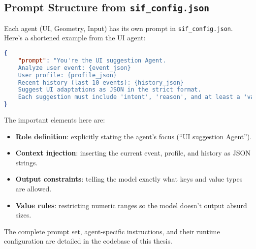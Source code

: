 \subsection{Prompt Structure from \texttt{sif\_config.json}}
Each agent (UI, Geometry, Input) has its own prompt in \texttt{sif\_config.json}.\\
Here’s a shortened example from the UI agent:
\begin{lstlisting}[caption=Example UI Agent Prompt, language=json]
{
    "prompt": "You're the UI suggestion Agent.  
    Analyze user event: {event_json}  
    User profile: {profile_json}  
    Recent history (last 10 events): {history_json}  
    Suggest UI adaptations as JSON in the strict format.  
    Each suggestion must include 'intent', 'reason', and at least a 'value' and 'mode' field. Value must be a reasonable number (e.g., 1.2) with at most one decimal place, and represents a scaling value unless stated otherwise in the metadata (e.g. font size). Target can be 'all' or specific elements."
}
\end{lstlisting}
The important elements here are:
\begin{itemize}
    \item \textbf{Role definition}: explicitly stating the agent’s focus (“UI suggestion Agent”).
    \item \textbf{Context injection}: inserting the current event, profile, and history as JSON strings.
    \item \textbf{Output constraints}: telling the model exactly what keys and value types are allowed.
    \item \textbf{Value rules}: restricting numeric ranges so the model doesn’t output absurd sizes.
\end{itemize}
The complete prompt set, agent-specific instructions, and their runtime configuration are detailed in the codebase of this thesis.

